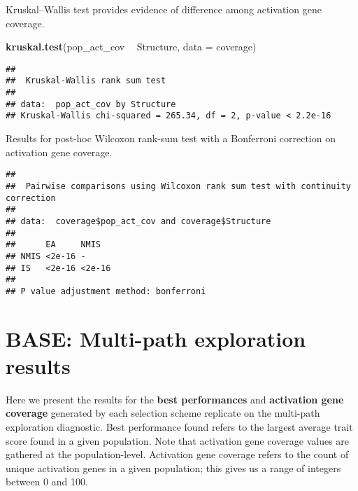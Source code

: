 \documentclass[]{book}
\newenvironment{Shaded}{\begin{snugshade}}{\end{snugshade}}
\newcommand{\DataTypeTok}[1]{\textcolor[rgb]{0.13,0.29,0.53}{#1}}
\newcommand{\KeywordTok}[1]{\textcolor[rgb]{0.13,0.29,0.53}{\textbf{#1}}}
\newcommand{\NormalTok}[1]{#1}
\newcommand{\OperatorTok}[1]{\textcolor[rgb]{0.81,0.36,0.00}{\textbf{#1}}}
\newcommand{\OtherTok}[1]{\textcolor[rgb]{0.56,0.35,0.01}{#1}}
\newcommand{\StringTok}[1]{\textcolor[rgb]{0.31,0.60,0.02}{#1}}
\begin{document}
Kruskal--Wallis test provides evidence of difference among activation gene coverage.

\begin{Shaded}
\begin{Highlighting}[]
\KeywordTok{kruskal.test}\NormalTok{(pop_act_cov }\OperatorTok{~}\StringTok{ }\NormalTok{Structure, }\DataTypeTok{data =}\NormalTok{ coverage)}
\end{Highlighting}
\end{Shaded}

\begin{verbatim}
## 
##  Kruskal-Wallis rank sum test
## 
## data:  pop_act_cov by Structure
## Kruskal-Wallis chi-squared = 265.34, df = 2, p-value < 2.2e-16
\end{verbatim}

Results for post-hoc Wilcoxon rank-sum test with a Bonferroni correction on activation gene coverage.

\begin{Shaded}
\end{Shaded}

\begin{verbatim}
## 
##  Pairwise comparisons using Wilcoxon rank sum test with continuity correction 
## 
## data:  coverage$pop_act_cov and coverage$Structure 
## 
##      EA     NMIS  
## NMIS <2e-16 -     
## IS   <2e-16 <2e-16
## 
## P value adjustment method: bonferroni
\end{verbatim}

\hypertarget{base-multi-path-exploration-results}{%
\chapter{BASE: Multi-path exploration results}\label{base-multi-path-exploration-results}}

Here we present the results for the \textbf{best performances} and \textbf{activation gene coverage} generated by each selection scheme replicate on the multi-path exploration diagnostic.
Best performance found refers to the largest average trait score found in a given population.
Note that activation gene coverage values are gathered at the population-level.
Activation gene coverage refers to the count of unique activation genes in a given population; this gives us a range of integers between 0 and 100.
\end{document}
